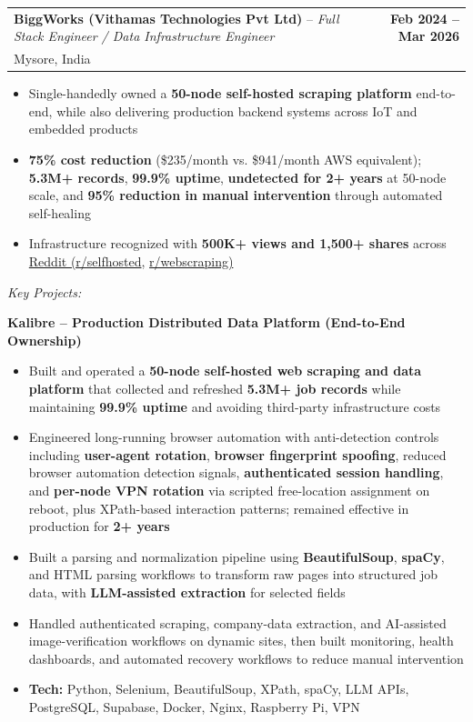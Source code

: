 \documentclass[letterpaper,10.5pt]{article}
\makeatletter
\newcommand{\resumeItem}[1]{
  \item\small{#1\vspace{1pt}}
}
\newcommand{\resumeRole}[4]{
  \vspace{-1pt}\item[]
    \begin{tabular*}{\textwidth}{l@{\extracolsep{\fill}}r}
      \textbf{#1} -- \textit{#3} & \textbf{#2}\\
      \small #4 &  \\
    \end{tabular*}\vspace{-4pt}
}
\newcommand{\bulletListStart}{\begin{itemize}[leftmargin=0.2in, itemsep=0pt, topsep=1pt]}
\newcommand{\bulletListEnd}{\end{itemize}\vspace{2pt}}
\newcommand{\projectEntry}[2]{
  \needspace{4\baselineskip}
  \vspace{4pt}
  {\small\textbf{#1}} \hfill {\small\textit{#2}}\\[-6pt]
}
\makeatother
\begin{document}
  \resumeRole
    {BiggWorks (Vithamas Technologies Pvt Ltd)}{Feb 2024 -- Mar 2026}
    {Full Stack Engineer / Data Infrastructure Engineer}{Mysore, India}
  \bulletListStart
    \resumeItem{Single-handedly owned a \textbf{50-node self-hosted scraping platform} end-to-end, while also delivering production backend systems across IoT and embedded products}
    \resumeItem{\textbf{75\% cost reduction} (\$235/month vs. \$941/month AWS equivalent); \textbf{5.3M+ records}, \textbf{99.9\% uptime}, \textbf{undetected for 2+ years} at 50-node scale, and \textbf{95\% reduction in manual intervention} through automated self-healing}
    \resumeItem{Infrastructure recognized with \textbf{500K+ views and 1,500+ shares} across \href{https://www.reddit.com/r/selfhosted/comments/1rsflyj/fully_selfhosted_distributed_scraping/}{Reddit (r/selfhosted}, \href{https://www.reddit.com/r/webscraping/comments/1rqsvgp/python_selenium_at_scale_50_nodes_39m_records/}{r/webscraping)}}
  \bulletListEnd

  \vspace{2pt}
  {\small\textit{Key Projects:}}
  \vspace{2pt}

  \projectEntry{Kalibre -- Production Distributed Data Platform (End-to-End Ownership)}{}
  \bulletListStart
    \resumeItem{Built and operated a \textbf{50-node self-hosted web scraping and data platform} that collected and refreshed \textbf{5.3M+ job records} while maintaining \textbf{99.9\% uptime} and avoiding third-party infrastructure costs}
    \resumeItem{Engineered long-running browser automation with anti-detection controls including \textbf{user-agent rotation}, \textbf{browser fingerprint spoofing}, reduced browser automation detection signals, \textbf{authenticated session handling}, and \textbf{per-node VPN rotation} via scripted free-location assignment on reboot, plus XPath-based interaction patterns; remained effective in production for \textbf{2+ years}}
    \resumeItem{Built a parsing and normalization pipeline using \textbf{BeautifulSoup}, \textbf{spaCy}, and HTML parsing workflows to transform raw pages into structured job data, with \textbf{LLM-assisted extraction} for selected fields}
    \resumeItem{Handled authenticated scraping, company-data extraction, and AI-assisted image-verification workflows on dynamic sites, then built monitoring, health dashboards, and automated recovery workflows to reduce manual intervention}
    \resumeItem{\textbf{Tech:} Python, Selenium, BeautifulSoup, XPath, spaCy, LLM APIs, PostgreSQL, Supabase, Docker, Nginx, Raspberry Pi, VPN}
  \bulletListEnd
\end{document}
